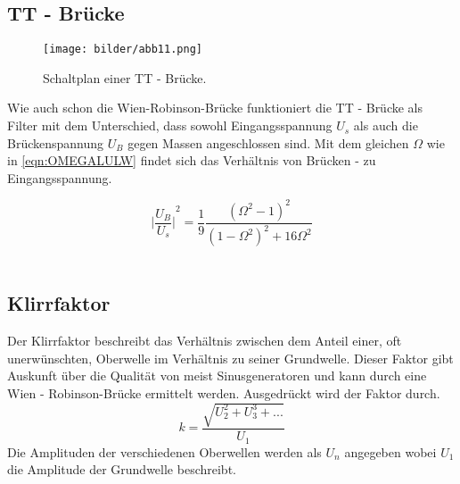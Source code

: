 \subsection{TT - Brücke}
\begin{figure}
    \centering
    \texttt{[image: bilder/abb11.png]}
    \caption{Schaltplan einer TT - Brücke. \cite{skript}} 
    \label{fig:abb11}
\end{figure}
\begin{flushleft}
Wie auch schon die Wien-Robinson-Brücke funktioniert die TT - Brücke als Filter mit dem Unterschied, dass sowohl Eingangsspannung
$U_s$ als auch die Brückenspannung $U_{B}$ gegen Massen angeschlossen sind.
Mit dem gleichen $\Omega$ wie in \eqref{eqn:OMEGALULW} findet sich das Verhältnis von Brücken - zu Eingangsspannung.
\end{flushleft}
\begin{equation}
    {\biggl| \frac{U_{B}}{U_s} \biggr| }^2 = \frac{1}{9}\frac{(\Omega^2 -1)^2}{(1-\Omega^2)^2+16\Omega^2} 
\end{equation}
\\
\newline
\subsection{Klirrfaktor}
Der Klirrfaktor beschreibt das Verhältnis zwischen dem Anteil einer, oft unerwünschten, Oberwelle im Verhältnis zu seiner Grundwelle.
Dieser Faktor gibt Auskunft über die Qualität von meist Sinusgeneratoren und kann durch eine Wien - Robinson-Brücke ermittelt werden.
Ausgedrückt wird der Faktor durch.
\begin{equation}
    \label{eqn:GlasGoesklirr}   
    k = \frac{\sqrt{U_2^2+U_3^3+...}}{U_1}
\end{equation}
Die Amplituden der verschiedenen Oberwellen werden als $U_n$ angegeben wobei $U_1$ die Amplitude der Grundwelle beschreibt.














